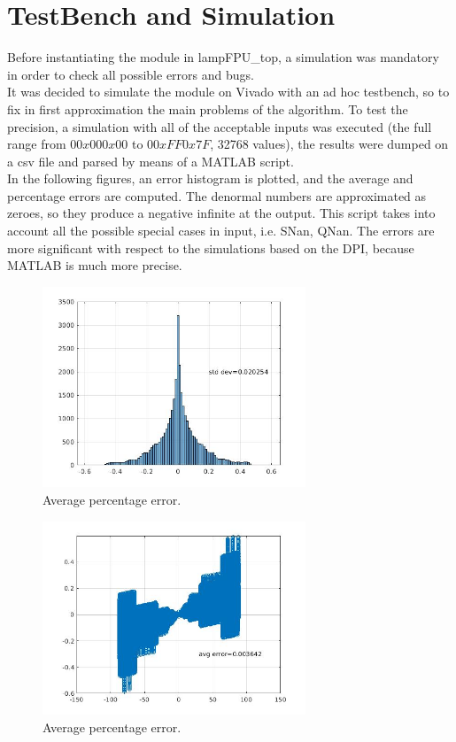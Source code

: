 \documentclass{report}
\begin{document}
\chapter{TestBench and Simulation}
Before instantiating the module in lampFPU\_top, a simulation was mandatory in order to check all possible errors and bugs.
\\It was decided to simulate the module on Vivado with an ad hoc testbench, so to fix in first approximation the main problems of the algorithm. To test the precision, a simulation with all of the acceptable inputs was executed (the full range from $0 0x00 0x00$ to $0 0xFF 0x7F$, 32768 values), the results were dumped on a csv file and parsed by means of a MATLAB script.
\\In the following figures, an error histogram is plotted, and the average and percentage errors are computed.
The denormal numbers are approximated as zeroes, so they produce a negative infinite at the output.
This script takes into account all the possible special cases in input, i.e. SNan, QNan.
The errors are more significant with respect to the simulations based on the DPI, because MATLAB is much more precise.
\begin{figure}[ht]
  \centering
    \includegraphics[width=0.7\textwidth]{images/hist.jpg}
    \caption{Average percentage error.}
\end{figure}
    
\begin{figure}[ht]
  \centering
    \includegraphics[width=0.7\textwidth]{images/avg_err.jpg}
    \caption{Average percentage error.}
\end{figure}
\end{document}
